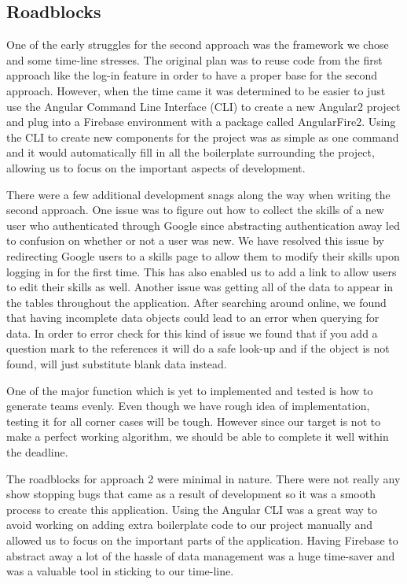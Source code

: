 \documentclass[conference]{IEEEtran}
\begin{document}
\subsection{Roadblocks}

One of the early struggles for the second approach was the framework we chose and some time-line stresses. The original plan was to reuse code from the first approach like the log-in feature in order to have a proper base for the second approach. However, when the time came it was determined to be easier to just use the Angular Command Line Interface (CLI) to create a new Angular2 project and plug into a Firebase environment with a package called AngularFire2. Using the CLI to create new components for the project was as simple as one command and it would automatically fill in all the boilerplate surrounding the project, allowing us to focus on the important aspects of development. 

There were a few additional development snags along the way when writing the second approach. One issue was to figure out how to collect the skills of a new user who authenticated through Google since abstracting authentication away led to confusion on whether or not a user was new. We have resolved this issue by redirecting Google users to a skills page to allow them to modify their skills upon logging in for the first time. This has also enabled us to add a link to allow users to edit their skills as well. Another issue was getting all of the data to appear in the tables throughout the application. After searching around online, we found that having incomplete data objects could lead to an error when querying for data. In order to error check for this kind of issue we found that if you add a question mark to the references it will do a safe look-up and if the object is not found, will just substitute blank data instead. 

One of the major function which is yet to implemented and tested is how to generate teams evenly. Even though we have rough idea of implementation, testing it for all corner cases will be tough. However since our target is not to make a perfect working algorithm, we should be able to complete it well within the deadline.

The roadblocks for approach 2 were minimal in nature. There were not really any show stopping bugs that came as a result of development so it was a smooth process to create this application. Using the Angular CLI was a great way to avoid working on adding extra boilerplate code to our project manually and allowed us to focus on the important parts of the application. Having Firebase to abstract away a lot of the hassle of data management was a huge time-saver and was a valuable tool in sticking to our time-line. 
\end{document}
